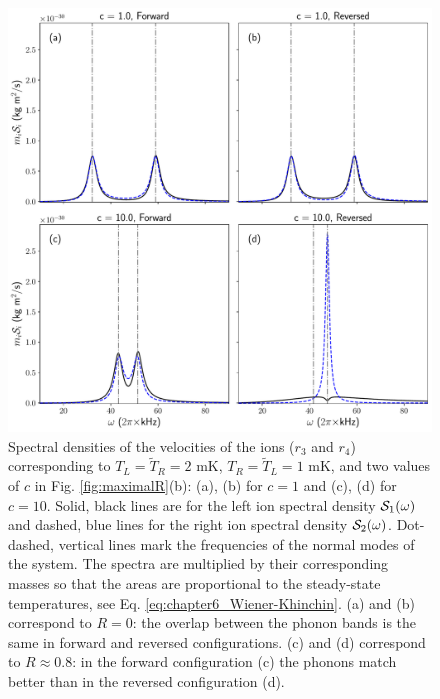\begin{figure}[t]
  \center
  \includegraphics[width=0.75\linewidth]{Figures/SpectrumComparative.pdf}
  \caption{Spectral densities of the velocities of the ions ($r_3$ and $r_4$) corresponding to $T_L=\tilde{T}_R=2$ mK, $T_R=\tilde{T}_L=1$ mK, and  two values of $c$ in Fig. \ref{fig:maximalR}(b): (a), (b) for $c=1$ and (c), (d) for $c=10$. Solid, black lines are for the left ion spectral density ${\cal{S}}_1(\omega)$ and dashed, blue lines for the right ion spectral density
 ${\cal{S}}_2(\omega)$. Dot-dashed, vertical lines mark the frequencies of the normal modes of the system. The spectra are multiplied by their corresponding masses so that  the areas are proportional to the steady-state temperatures, see  Eq. \eqref{eq:chapter6_Wiener-Khinchin}. (a) and (b) correspond to $R = 0$:  the overlap between the phonon bands is the same in forward and reversed configurations. (c) and (d) correspond to $R\approx 0.8$:  in the forward configuration (c)  the phonons match better than in the reversed configuration (d).}
  \label{fig:Figure_Spectra}
\end{figure}

